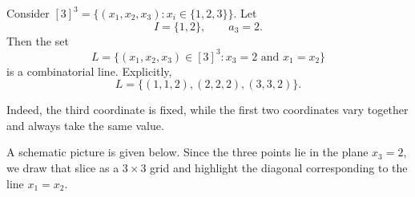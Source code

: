 \documentclass[11pt, a4paper]{ctexrep}
\begin{document}
\begin{example}
    Consider $[3]^3=\{(x_1,x_2,x_3):x_i\in\{1,2,3\}\}$.
    Let
    \[
        I=\{1,2\},
        \qquad
        a_3=2.
    \]
    Then the set
    \[
        L=\{(x_1,x_2,x_3)\in [3]^3 : x_3=2 \text{ and } x_1=x_2\}
    \]
    is a combinatorial line. Explicitly,
    \[
        L=\{(1,1,2),(2,2,2),(3,3,2)\}.
    \]

    Indeed, the third coordinate is fixed, while the first two coordinates vary together and always take the same value.

    \medskip

    A schematic picture is given below. Since the three points lie in the plane $x_3=2$, we draw that slice as a $3\times 3$ grid and highlight the diagonal corresponding to the line $x_1=x_2$.

    \begin{center}
    \end{center}

\end{example}
\end{document}
